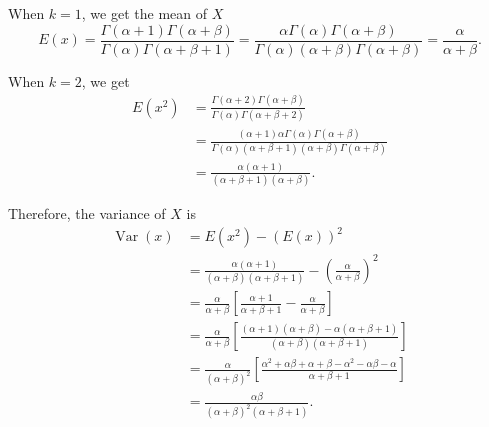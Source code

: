 \documentclass[12pt,a4paper]{report}
\theoremstyle{definition}
\theoremstyle{plain}
\theoremstyle{definition}
\begin{document}
When $k = 1$, we get the mean of $X$
\[E(x)=\frac{\Gamma(\alpha+1)\Gamma(\alpha+\beta)}{\Gamma(\alpha)\Gamma(\alpha+\beta+1)}=\frac{\alpha\Gamma(\alpha)\Gamma(\alpha+\beta)}{\Gamma(\alpha)(\alpha+\beta)\Gamma(\alpha+\beta)}=\frac{\alpha}{\alpha+\beta}.\]



When $k = 2$, we get 
\begin{align*}
E(x^2)  & = \frac{\Gamma(\alpha+2)\Gamma(\alpha+\beta)}{\Gamma(\alpha)\Gamma(\alpha+\beta+2)}\\
      &  = \frac{(\alpha+1)\alpha\Gamma(\alpha)\Gamma(\alpha+\beta)}{\Gamma(\alpha)(\alpha+\beta+1)(\alpha+\beta)\Gamma(\alpha+\beta)}\\
       & = \frac{\alpha(\alpha+1)}{(\alpha+\beta+1)(\alpha+\beta)}.
\end{align*}


Therefore, the variance of $X$ is
\begin{align*}
\operatorname{Var}(x) & = E(x^2)-(E(x))^2\\
 &=\frac{\alpha(\alpha+1)}{(\alpha+\beta)(\alpha+\beta+1)}-\left(\frac{\alpha}{\alpha+\beta}\right)^2\\
                                      & = \frac{\alpha}{\alpha+\beta}\left[\frac{\alpha+1}{\alpha+\beta+1}-\frac{\alpha}{\alpha+\beta}\right]\\
                                      & = \frac{\alpha}{\alpha+\beta}\left[\frac{(\alpha+1)(\alpha+\beta)-\alpha(\alpha+\beta+1)}{(\alpha+\beta)(\alpha+\beta+1)}\right]\\
                                      & = \frac{\alpha}{(\alpha+\beta)^2}\left[\frac{\alpha^2+\alpha\beta+\alpha+\beta-\alpha^2-\alpha\beta-\alpha}{\alpha+\beta+1}\right]\\
                                      & = \frac{\alpha\beta}{(\alpha+\beta)^2(\alpha+\beta+1)}.                                            
\end{align*}
\end{document}
